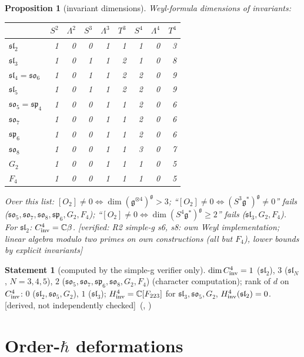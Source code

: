 \documentclass[10pt,a4paper]{article}
\numberwithin{equation}{section}
\newtheorem{proposition}[theorem]{Proposition}
\theoremstyle{definition}
\newtheorem{dstatement}[theorem]{Statement}
\theoremstyle{remark}
\newcommand{\g}{\mathfrak g}
\newcommand{\fsl}{\mathfrak{sl}}
\newcommand{\fso}{\mathfrak{so}}
\newcommand{\fsp}{\mathfrak{sp}}
\newcommand{\ver}[1]{\textup{[verified: #1]}}
\newcommand{\der}{\textup{[derived, not independently checked]}}
\begin{document}
\begin{proposition}[invariant dimensions]\label{prop-inv}
Weyl-formula dimensions of invariants:
{\small
\begin{longtable}{@{}lrrrrrrrr@{}}
\toprule
 & $S^2$ & $\Lambda^2$ & $S^3$ & $\Lambda^3$ & $T^3$ & $S^4$ & $\Lambda^4$ & $T^4$\\
\midrule
$\fsl_2$ & 1&0&0&1&1&1&0&3\\
$\fsl_3$ & 1&0&1&1&2&1&0&8\\
$\fsl_4=\fso_6$ & 1&0&1&1&2&2&0&9\\
$\fsl_5$ & 1&0&1&1&2&2&0&9\\
$\fso_5=\fsp_4$ & 1&0&0&1&1&2&0&6\\
$\fso_7$ & 1&0&0&1&1&2&0&6\\
$\fsp_6$ & 1&0&0&1&1&2&0&6\\
$\fso_8$ & 1&0&0&1&1&3&0&7\\
$G_2$ & 1&0&0&1&1&1&0&5\\
$F_4$ & 1&0&0&1&1&1&0&5\\
\bottomrule
\end{longtable}}
Over this list: $[O_2]\neq0\iff\dim(\g^{\otimes4})^\g>3$; ``$[O_2]\ne0\iff(S^3\g^*)^\g\ne0$'' fails ($\fso_5,\fso_7,\fso_8,\fsp_6,G_2,F_4$); ``$[O_2]\ne0\iff\dim(S^4\g^*)^\g\ge2$'' fails ($\fsl_3,G_2,F_4$). For $\fsl_2$: $C^4_{\rm inv}=\mathbb C\beta$.
\ver{R2 simple-g s6, s8: own Weyl implementation; linear algebra modulo two primes on own constructions (all but $F_4$), lower bounds by explicit invariants}
\end{proposition}

\begin{dstatement}[computed by the simple-g verifier only]
$\dim C^4_{\rm inv}=1$ ($\fsl_2$), $3$ ($\fsl_N$, $N=3,4,5$), $2$ ($\fso_5,\fso_7,\fsp_6,\fso_8,G_2,F_4$) (character computation); rank of $d$ on $C^4_{\rm inv}$: $0$ ($\fsl_2,\fso_5,G_2$), $1$ ($\fsl_3$); $H^4_{\rm inv}=\mathbb C[F_{223}]$ for $\fsl_3,\fso_5,G_2$, $H^4_{\rm inv}(\fsl_2)=0$. \der\ (, )
\end{dstatement}

\section{\texorpdfstring{Order-$\hbar$ deformations}{Order-hbar deformations}}\label{sec-deform}
\end{document}
